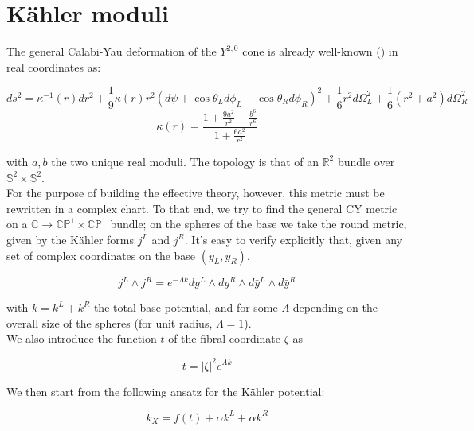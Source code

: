 
\section{K\"ahler moduli}

The general Calabi-Yau deformation of the $Y^{2,0}$ cone is already well-known () in real coordinates as:

\begin{equation}
ds^2 = \kappa^{-1}(r)dr^2 + \frac{1}{9} \kappa(r) r^2 (d\psi + \cos\theta_L d\phi_L + \cos\theta_R d\phi_R)^2 + \frac{1}{6} r^2 d\Omega_L^2 + \frac{1}{6}(r^2+a^2) d\Omega_R^2 \label{y20metric} \end{equation}
\begin{equation}
	\kappa(r) = \frac{1 + \frac{9a^2}{r^2} - \frac{b^6}{r^6}}{1+ \frac{6a^2}{r^2}}
\end{equation}

with $a,b$ the two unique real moduli. The topology is that of an $\mathbb{R}^2$ bundle over $\mathbb{S}^2 \times \mathbb{S}^2$.\\

For the purpose of building the effective theory, however, this metric must be rewritten in a complex chart. To that end, we try to find the general CY metric on a $\mathbb{C} \rightarrow \mathbb{CP}^1 \times \mathbb{CP}^1$ bundle; on the spheres of the base we take the round metric, given by the K\"ahler forms $j^L$ and $j^R$. It's easy to verify explicitly that, given any set of complex coordinates on the base $(y_L,y_R)$,

\begin{equation}
	j^L \wedge j^R = e^{-\Lambda k} dy^L \wedge dy^R \wedge d\bar y^L \wedge d\bar y^R
\end{equation}

with $k = k^L + k^R$ the total base potential, and for some $\Lambda$ depending on the overall size of the spheres (for unit radius, $\Lambda = 1$).\\

We also introduce the function $t$ of the fibral coordinate $\zeta$ as 

\begin{equation}
	t = |\zeta|^2 e^{\Lambda k}
\end{equation}

We then start from the following ansatz for the K\"ahler potential:

\begin{equation}
	k_X = f(t) + \alpha k^L + \tilde\alpha k^R
\end{equation}

